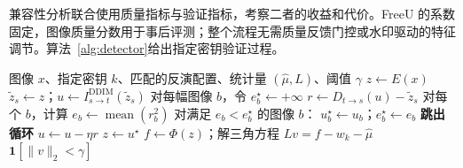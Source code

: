\documentclass[10pt,twocolumn,letterpaper]{article}
\begin{document}
兼容性分析联合使用质量指标与验证指标，考察二者的收益和代价。FreeU 的系数固定，图像质量分数用于事后评测；整个流程无需质量反馈门控或水印驱动的特征调节。算法~\ref{alg:detector}给出指定密钥验证过程。

\begin{algorithm}[t]
\caption{Exact-DDIM 与协方差感知的指定密钥验证}\label{alg:detector}
\small
\begin{algorithmic}[1]
\Require 图像 $x$、指定密钥 $k$、匹配的反演配置、统计量 $(\widehat\mu,L)$、阈值 $\gamma$
\State $z\gets E(x)$
\State $\widetilde z_s\gets z$；$u\gets I^{\mathrm{DDIM}}_{s\to t}(\widetilde z_s)$
\State 对每幅图像 $b$，令 $e_b^\star\gets+\infty$
\State $r\gets D_{t\to s}(u)-\widetilde z_s$
\State 对每个 $b$，计算 $e_b\gets\operatorname{mean}(r_b^2)$
\State 对满足 $e_b<e_b^\star$ 的图像 $b$：
\State \hspace{1em}$u_b^\star\gets u_b$；$e_b^\star\gets e_b$
\State \textbf{跳出循环}
\EndIf
\State $u\gets u-\eta r$
\EndFor
\State $z\gets u^\star$
\EndFor
\State $f\gets\Phi(z)$；解三角方程 $Lv=f-w_k-\widehat\mu$
\State \Return $\mathbf1[\|v\|_2<\gamma]$
\end{algorithmic}
\end{algorithm}
\FloatBarrier
\clearpage\balance
\end{document}
